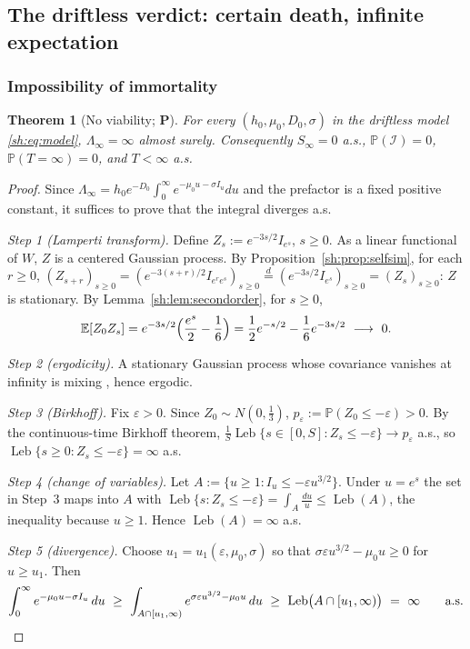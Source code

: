 \documentclass[11pt]{article}
\numberwithin{equation}{section}
\theoremstyle{plain}
\newtheorem{theorem}{Theorem}[section]
\theoremstyle{definition}
\theoremstyle{remark}
\newcommand{\E}{\mathbb{E}}
\newcommand{\PP}{\mathbb{P}}
\DeclareMathOperator{\Leb}{Leb}
\newcommand{\eqd}{\overset{d}{=}}
\newcommand{\Imm}{\mathcal{I}}
\begin{document}
\subsection{The driftless verdict: certain death, infinite expectation}
\label{sh:sub:verdict}

\subsubsection{Impossibility of immortality}\label{sh:subsub:noimm}

\begin{theorem}[No viability; \textbf{P}]\label{sh:thm:noimm}
For every $(h_0,\mu_0,D_0,\sigma)$ in the driftless model
\eqref{sh:eq:model}, $\Lambda_\infty=\infty$ almost surely. Consequently
$S_\infty=0$ a.s., $\PP(\Imm)=0$, $\PP(T=\infty)=0$, and $T<\infty$ a.s.
\end{theorem}

\begin{proof}
Since $\Lambda_\infty=h_0e^{-D_0}\int_0^\infty e^{-\mu_0u-\sigma I_u}du$
and the prefactor is a fixed positive constant, it suffices to prove that
the integral diverges a.s.

\emph{Step 1 (Lamperti transform).} Define $Z_s:=e^{-3s/2}I_{e^s}$,
$s\ge0$. As a linear functional of $W$, $Z$ is a centered Gaussian process.
By Proposition~\ref{sh:prop:selfsim}, for each $r\ge0$,
$(Z_{s+r})_{s\ge0}=(e^{-3(s+r)/2}I_{e^re^s})_{s\ge0}
\eqd(e^{-3s/2}I_{e^s})_{s\ge0}=(Z_s)_{s\ge0}$: $Z$ is stationary. By
Lemma~\ref{sh:lem:secondorder}, for $s\ge0$,
\begin{equation}\label{sh:eq:lampcov}
\E[Z_0Z_s]=e^{-3s/2}\Bigl(\frac{e^{s}}{2}-\frac16\Bigr)
=\frac12e^{-s/2}-\frac16e^{-3s/2}\ \longrightarrow\ 0 .
\end{equation}

\emph{Step 2 (ergodicity).} A stationary Gaussian process whose covariance
vanishes at infinity is mixing \cite{Mar49}, hence ergodic.

\emph{Step 3 (Birkhoff).} Fix $\varepsilon>0$. Since
$Z_0\sim N(0,\tfrac13)$, $p_\varepsilon:=\PP(Z_0\le-\varepsilon)>0$. By the
continuous-time Birkhoff theorem,
$\tfrac1S\Leb\{s\in[0,S]:Z_s\le-\varepsilon\}\to p_\varepsilon$ a.s., so
$\Leb\{s\ge0:Z_s\le-\varepsilon\}=\infty$ a.s.

\emph{Step 4 (change of variables).} Let
$A:=\{u\ge1:I_u\le-\varepsilon u^{3/2}\}$. Under $u=e^s$ the set in Step~3
maps into $A$ with
$\Leb\{s:Z_s\le-\varepsilon\}=\int_A\frac{du}{u}\le\Leb(A)$,
the inequality because $u\ge1$. Hence $\Leb(A)=\infty$ a.s.

\emph{Step 5 (divergence).} Choose $u_1=u_1(\varepsilon,\mu_0,\sigma)$ so
that $\sigma\varepsilon u^{3/2}-\mu_0u\ge0$ for $u\ge u_1$. Then
\[
\int_0^\infty e^{-\mu_0u-\sigma I_u}\,du
\ \ge\ \int_{A\cap[u_1,\infty)}e^{\sigma\varepsilon u^{3/2}-\mu_0u}\,du
\ \ge\ \Leb\bigl(A\cap[u_1,\infty)\bigr)\ =\ \infty
\qquad\text{a.s.}\qedhere
\]
\end{proof}
\end{document}
